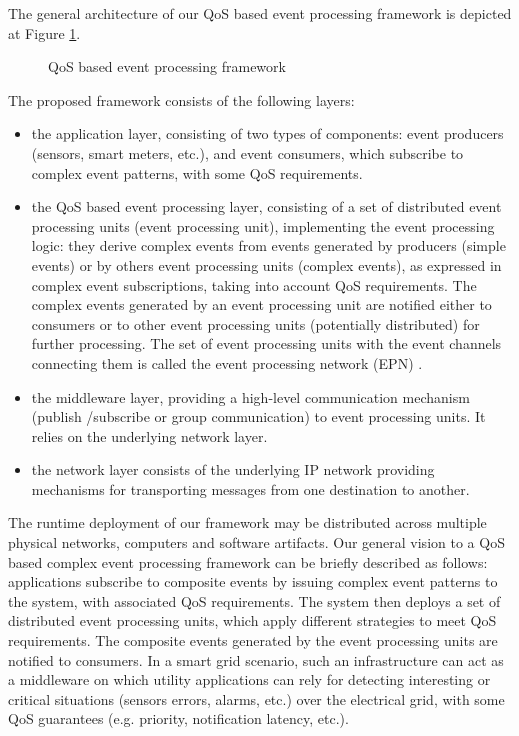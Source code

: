 \documentclass[a4paper,twoside]{article}
\begin{document}
The general architecture of our QoS based event processing framework is depicted at Figure \ref{fig:architecture}.
\begin{figure}[!h]
  \centering
   {}
  \caption{QoS based event processing framework}
  \label{fig:architecture}
 \end{figure}
 The proposed framework consists of the following layers:
\begin{itemize}
\item the application layer, consisting of two types of components: event producers (sensors, smart meters, etc.), and event consumers, which subscribe to complex event patterns, with some QoS requirements.
\item the QoS based event processing layer, consisting of a set of distributed event processing units (event processing unit), implementing the event processing logic: they derive complex events from events generated by producers (simple events) or by others event processing units (complex events), as expressed in complex event subscriptions, taking into account QoS requirements. The complex events generated by an event processing unit are notified either to consumers or to other event processing units (potentially distributed) for further processing. The set of event processing units with the event channels connecting them is called the event processing network (EPN) \cite{Luckham2011}.
\item the middleware layer, providing a high-level communication mechanism (publish /subscribe or group communication) to event processing units. It relies on the underlying network layer.
\item the network layer consists of the underlying IP network providing mechanisms for transporting messages from one destination to another.  
\end{itemize}
The runtime deployment of our framework may be distributed across multiple physical networks, computers and software artifacts.
Our general vision to a QoS based complex event processing framework can be briefly described as follows: applications subscribe to composite events by issuing complex event patterns to the system, with associated QoS requirements. The system then deploys a set of distributed event processing units, which apply different strategies to meet QoS requirements. The composite events generated by the event processing units are notified to consumers. In a smart grid scenario, such an infrastructure can act as a middleware on which utility applications can rely for detecting interesting or critical situations (sensors errors, alarms, etc.) over the electrical grid, with some QoS guarantees (e.g. priority, notification latency, etc.).
\end{document}

